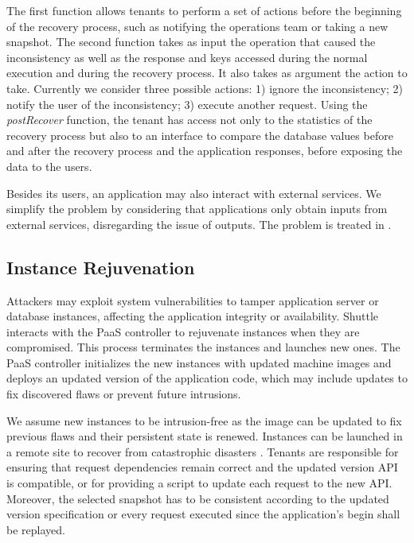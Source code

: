 The first function allows tenants to perform a set of actions before the beginning of the recovery process, such as notifying the operations team or taking a new snapshot. 
The second function takes as input the operation that caused the inconsistency as well as the response and keys accessed during the normal execution and during the recovery process. It also takes as argument the action to take. Currently we consider three possible actions: 1) ignore the inconsistency; 2) notify the user of the inconsistency; 3) execute another request. 
Using the \textit{postRecover} function, the tenant has access not only to the statistics of the recovery process but also to an interface to compare the database values before and after the recovery process and the application responses, before exposing the data to the users. 

Besides its users, an application may also interact with external services. We simplify the problem by considering that applications only obtain inputs from external services, disregarding the issue of outputs. The problem is treated in \cite{aire,undoForOperators}. 



\subsection{Instance Rejuvenation}
\label{sec:recovery:instance_rejuventaion}
Attackers may exploit system vulnerabilities to tamper application server or database instances, affecting the application integrity or availability. Shuttle interacts with the \ac{PaaS} controller to rejuvenate instances when they are compromised. This process terminates the instances and launches new ones. The PaaS controller initializes the new instances with updated machine images and deploys an updated version of the application code, which may include updates to fix discovered flaws or prevent future intrusions.

We assume new instances to be intrusion-free as the image can be updated to fix previous flaws and their persistent state is renewed. Instances can be launched in a remote site to recover from catastrophic disasters \cite{cloud-disaster}. Tenants are responsible for ensuring that request dependencies remain correct and the updated version API is compatible, or for providing a script to update each request to the new API. Moreover, the selected snapshot has to be consistent according to the updated version specification or every request executed since the application's begin shall be replayed.

